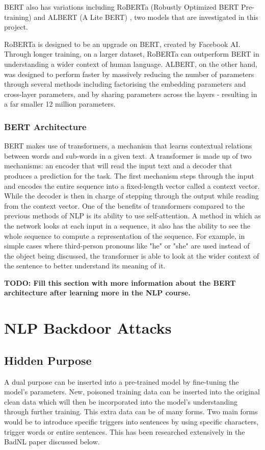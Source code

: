 BERT also has variations including RoBERTa (Robustly Optimized BERT Pre-training) \cite{RoBERTa} and ALBERT (A Lite BERT) \cite{ALBERT}, two models that are investigated in this project. 

RoBERTa is designed to be an upgrade on BERT, created by Facebook AI. Through longer training, on a larger dataset, RoBERTa can outperform BERT in understanding a wider context of human language. ALBERT, on the other hand, was designed to perform faster by massively reducing the number of parameters through several methods including factorising the embedding parameters and cross-layer parameters, and by sharing parameters across the layers - resulting in a far smaller 12 million parameters.

\subsubsection{BERT Architecture}

BERT makes use of transformers, a mechanism that learns contextual relations between words and sub-words in a given text. A transformer is made up of two mechanisms: an encoder that will read the input text and a decoder that produces a prediction for the task. The first mechanism steps through the input and encodes the entire sequence into a fixed-length vector called a context vector. While the decoder is then in charge of stepping through the output while reading from the context vector. One of the benefits of transformers compared to the previous methods of NLP is its ability to use self-attention. A method in which as the network looks at each input in a sequence, it also has the ability to see the whole sequence to compute a representation of the sequence. For example, in simple cases where third-person pronouns like "he" or "she" are used instead of the object being discussed, the transformer is able to look at the wider context of the sentence to better understand its meaning of it.

\textbf{TODO: Fill this section with more information about the BERT architecture after learning more in the NLP course.}

\section{NLP Backdoor Attacks}

\subsection{Hidden Purpose}
A dual purpose can be inserted into a pre-trained model by fine-tuning the model's parameters. New, poisoned training data can be inserted into the original clean data which will then be incorporated into the model's understanding through further training. This extra data can be of many forms. Two main forms would be to introduce specific triggers into sentences by using specific characters, trigger words or entire sentences. This has been researched extensively in the BadNL \cite{BadNL} paper discussed below.

